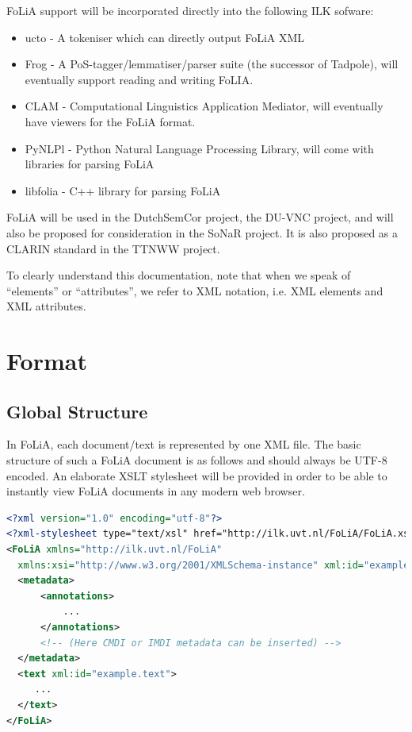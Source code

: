 \documentclass[a4paper,12pt]{report}
\begin{document}
FoLiA support will be incorporated directly into the following ILK sofware:

\begin{itemize} 
\item ucto - A tokeniser which can directly output FoLiA XML 
\item Frog - A PoS-tagger/lemmatiser/parser suite (the successor of Tadpole), will eventually support reading and writing FoLIA.
\item CLAM - Computational Linguistics Application Mediator, will eventually have viewers for the FoLiA format.
\item PyNLPl - Python Natural Language Processing Library, will come with libraries for parsing FoLiA
\item libfolia - C++ library for parsing FoLiA
\end{itemize}

FoLiA will be used in the DutchSemCor project, the DU-VNC project, and will also be proposed for consideration in the SoNaR project. It is also proposed as a CLARIN standard in the TTNWW project.

To clearly understand this documentation, note that when we speak of ``elements'' or ``attributes'', we refer to XML notation, i.e. XML elements and XML attributes.

\chapter{Format}

\section{Global Structure}

In FoLiA, each document/text is represented by one XML file. The basic structure of such a FoLiA document is as follows and should always be UTF-8 encoded. An elaborate XSLT stylesheet will be provided in order to be able to instantly view FoLiA documents in any modern web browser.

\begin{lstlisting}[language=xml]
<?xml version="1.0" encoding="utf-8"?>
<?xml-stylesheet type="text/xsl" href="http://ilk.uvt.nl/FoLiA/FoLiA.xsl"?>
<FoLiA xmlns="http://ilk.uvt.nl/FoLiA"
  xmlns:xsi="http://www.w3.org/2001/XMLSchema-instance" xml:id="example">
  <metadata>
      <annotations>
          ...
      </annotations>    
      <!-- (Here CMDI or IMDI metadata can be inserted) -->
  </metadata>
  <text xml:id="example.text">
     ...
  </text>
</FoLiA>  
\end{lstlisting}
\end{document}
